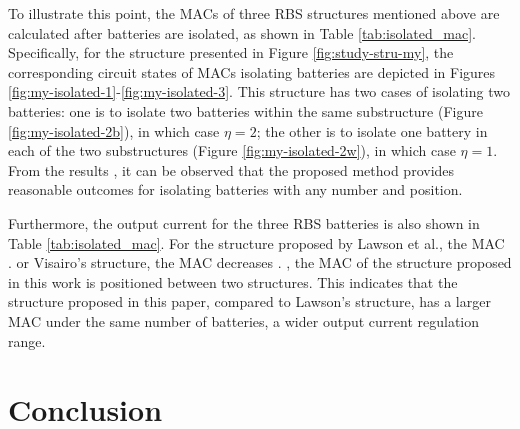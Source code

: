 \documentclass{article}
\begin{document}
To illustrate this point, the MACs of  three RBS structures mentioned above are calculated after  batteries are isolated, as shown in Table \ref{tab:isolated_mac}. 
Specifically, for the structure presented in Figure \ref{fig:study-stru-my}, the corresponding circuit states of MACs  isolating  batteries are depicted in Figures \ref{fig:my-isolated-1}-\ref{fig:my-isolated-3}. 
This structure has two cases of isolating two batteries: 
one is to isolate two batteries within the same substructure (Figure \ref{fig:my-isolated-2b}), in which case $\eta=2$; the other is to isolate one battery in each of the two substructures (Figure \ref{fig:my-isolated-2w}), in which case $\eta=1$. 
From the results , it can be observed that the proposed method provides reasonable outcomes for isolating batteries with any number and position.


Furthermore, the  output current for the three RBS  batteries is also shown in Table \ref{tab:isolated_mac}. 
For the structure proposed by Lawson et al., the MAC .
 or Visairo's structure, the MAC decreases . 
, the MAC of the structure proposed in this work is positioned between  two structures. 
This indicates that the structure proposed in this paper, compared to Lawson's structure, has a larger MAC under the same number of batteries,  a wider output current regulation range. 

\section{Conclusion}
\end{document}
